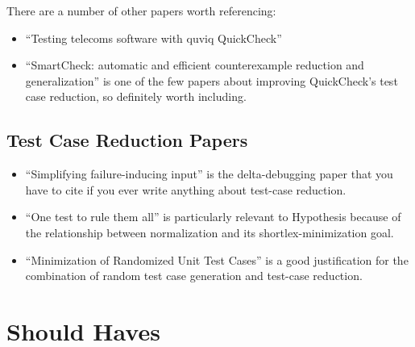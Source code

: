 There are a number of other papers worth referencing:

\begin{itemize}
\item ``Testing telecoms software with quviq QuickCheck''\cite{DBLP:conf/erlang/ArtsHJW06}
\item ``SmartCheck: automatic and efficient counterexample reduction and generalization''\cite{DBLP:conf/haskell/Pike14} is one of the few papers about improving QuickCheck's test case reduction,
so definitely worth including.
\end{itemize}

\subsection{Test Case Reduction Papers}

\begin{itemize}
\item ``Simplifying failure-inducing input''\cite{DBLP:conf/issta/HildebrandtZ00} is the delta-debugging paper that you have to cite if you ever write anything about test-case reduction.
\item ``One test to rule them all''\cite{DBLP:conf/issta/GroceHK17} is particularly relevant to Hypothesis because of the relationship between normalization and its shortlex-minimization goal.
\item ``Minimization of Randomized Unit Test Cases''\cite{DBLP:conf/issre/LeiA05} is a good justification for the combination of random test case generation and test-case reduction.
\end{itemize}

\section{Should Haves}

